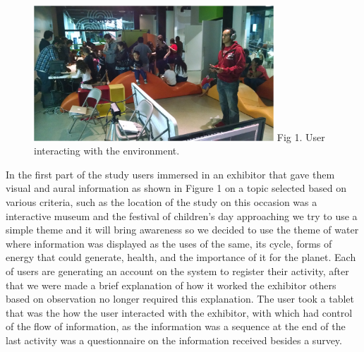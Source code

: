 \documentclass[journal]{IEEEtran}
\begin{document}
\begin{figure}[H]
	\centering
	\includegraphics [width=90mm] {tromp.PNG}
	\label{fig:Figure 1}
	Fig 1. User interacting with the environment.
\end{figure}

In the first part of the study users immersed in an exhibitor that gave them visual and aural information as shown in Figure 1 on a topic selected based on various criteria, such as the location of the study on this occasion was a interactive museum and the festival of children's day approaching we try to use a simple theme and it will bring awareness so we decided to use the theme of water where information was displayed as the uses of the same, its cycle, forms of energy that could generate, health, and the importance of it for the planet. Each of users are generating an account on the system to register their activity, after that we were made a brief explanation of how it worked the exhibitor others based on observation no longer required this explanation. The user took a tablet that was the how the user interacted with the exhibitor, with which had control of the flow of information, as the information was a sequence at the end of the last activity was a questionnaire on the information received besides a survey.
\end{document}
